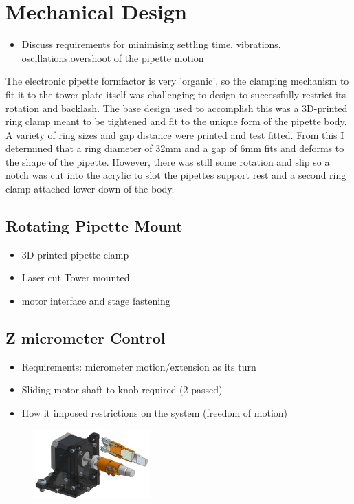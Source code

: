 \section{Mechanical Design}

\begin{itemize}
    \item Discuss requirements for minimising settling time, vibrations, oscillations.overshoot of the pipette motion
\end{itemize}

The electronic pipette formfactor is very 'organic', so the clamping mechanism to fit it to the tower plate itself was challenging to design to successfully restrict its rotation and backlash.
The base design used to accomplish this was a 3D-printed ring clamp meant to be tightened and fit to the unique form of the pipette body. A variety of ring sizes and gap distance were printed and test fitted. From this I determined that a ring diameter of 32mm and a gap of 6mm fits and deforms to the shape of the pipette. However, there was still some rotation and slip so a notch was cut into the acrylic to slot the pipettes support rest and a second ring clamp attached lower down of the body.


\subsection{Rotating Pipette Mount}

\begin{itemize}
    \item 3D printed pipette clamp
    \item Laser cut Tower mounted
    \item motor interface and stage fastening
\end{itemize}

\subsection{Z micrometer Control}
\begin{itemize}
    \item Requirements: micrometer motion/extension as its turn
    \item Sliding motor shaft to knob required (2 passed)
    \item How it imposed restrictions on the system (freedom of motion)
\end{itemize}

\begin{figure}[h]
    \centering
    \includegraphics[width=0.4\textwidth]{img/z_control.png}
\end{figure}

